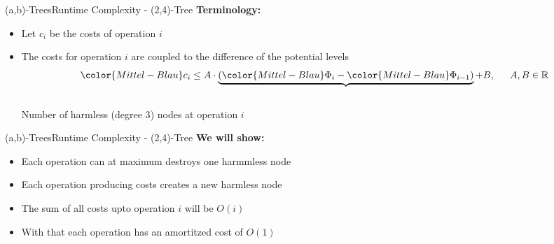\begin{frame}{(a,b)-Trees}{Runtime Complexity - (2,4)-Tree}
  \textbf{Terminology:}
  \begin{itemize}
    \item<2->
      Let {\color{Mittel-Blau}$c_i$} be the costs of operation
      {\color{Mittel-Blau}$i$}
    \item<3->
      The costs for operation {\color{Mittel-Blau}$i$} are coupled to the
      difference of the potential levels
      \begin{displaymath}
        {\color{Mittel-Blau}c_i} \leq A \cdot \underbrace{(
          {\color{Mittel-Blau}\Phi_i} -
          {\color{Mittel-Blau}\Phi_{i-1}}
        )} + B, \hspace{1.5em} A,B \in \mathbb{R}
      \end{displaymath}\\
      \vspace{-0.75em}
      Number of harmless ({\color{Mittel-Blau}degree 3}) nodes at operation
      {\color{Mittel-Blau}$i$}
  \end{itemize}
\end{frame}


\begin{frame}{(a,b)-Trees}{Runtime Complexity - (2,4)-Tree}
  \textbf{We will show:}
  \begin{itemize}
    \item<2->
      Each operation can at maximum destroys one harmmless node
    \item<3->
      Each operation producing costs creates a new harmless node
    \item<4->
      The sum of all costs upto operation {\color{Mittel-Blau}$i$} will be
      {\color{Mittel-Blau}$O(i)$}
    \item<5->
      With that each operation has an amortitzed cost of
      {\color{Mittel-Blau}$O(1)$}
  \end{itemize}
\end{frame}


